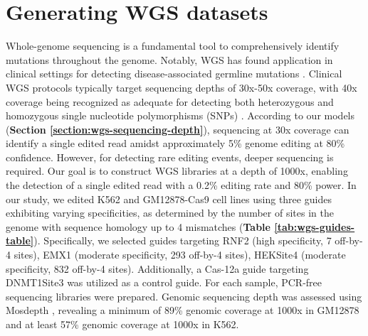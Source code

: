 \documentclass[a4paper, titlepage, openright]{book}
\begin{document}
\section{Generating WGS datasets}
Whole-genome sequencing is a fundamental tool to comprehensively identify mutations throughout the genome. Notably, WGS has found application in clinical settings for detecting disease-associated germline mutations \citep{thiffault2019clinical}. Clinical WGS protocols typically target sequencing depths of 30x-50x coverage, with 40x coverage being recognized as adequate for detecting both heterozygous and homozygous single nucleotide polymorphisms (SNPs) \citep{sun2021characterizing}. According to our models (\textbf{Section \ref{section:wgs-sequencing-depth}}), sequencing at 30x coverage can identify a single edited read amidst approximately 5\% genome editing at 80\% confidence. However, for detecting rare editing events, deeper sequencing is required. Our goal is to construct WGS libraries at a depth of 1000x, enabling the detection of a single edited read with a 0.2\% editing rate and 80\% power. In our study, we edited K562 and GM12878-Cas9 cell lines \citep{ma2017crispr} using three guides exhibiting varying specificities, as determined by the number of sites in the genome with sequence homology up to 4 mismatches (\textbf{Table \ref{tab:wgs-guides-table}}). Specifically, we selected guides targeting RNF2 (high specificity, 7 off-by-4 sites), EMX1 (moderate specificity, 293 off-by-4 sites), HEKSite4 (moderate specificity, 832 off-by-4 sites). Additionally, a Cas-12a guide targeting DNMT1Site3 was utilized as a control guide. For each sample, PCR-free sequencing libraries were prepared. Genomic sequencing depth was assessed using Mosdepth \citep{pedersen2018mosdepth}, revealing a minimum of 89\% genomic coverage at 1000x in GM12878 and at least 57\% genomic coverage at 1000x in K562.
\end{document}

